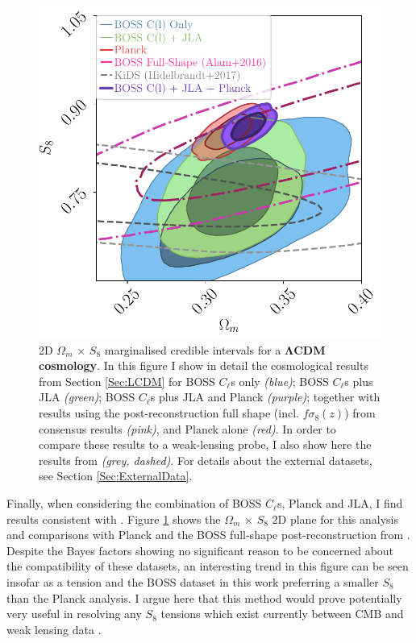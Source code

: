 \begin{figure}
\begin{center}
\includegraphics[scale=0.70]{BOSS-FIGS/LCDM_External_KidsOmega_m.pdf}
\caption[2D $\Omega_m \, \times \, S_8$ marginalised credible intervals for a $\Lambda$CDM cosmology.]{2D $\Omega_m \, \times \, S_8$ marginalised credible intervals for a \textbf{$\mathbf{\Lambda}$CDM cosmology}. In this figure I show in detail the cosmological results from Section \ref{Sec:LCDM} for BOSS $C_{\ell}$s only \textit{(blue)}; BOSS $C_{\ell}$s plus JLA \textit{(green)}; BOSS $C_{\ell}$s plus JLA and Planck \textit{(purple)}; together with results using the post-reconstruction full shape (incl. $f\sigma_8(z)$) from \protect\cite{2016BOSSCosmology} consensus results \textit{(pink)}, and Planck alone \textit{(red)}. In order to compare these results to a weak-lensing probe, I also show here the results from \protect\cite{2017MNRAS.465.1454H} \textit{(grey, dashed)}. For details about the external datasets, see Section \ref{Sec:ExternalData}.}
\label{fig:Om_S8_LCDM}
\end{center}
\end{figure}

\qquad Finally, when considering the combination of BOSS $C_{\ell}$s, Planck and JLA, I find results consistent with \cite{2016BOSSCosmology,2017MNRAS.465.1454H,2017arXiv170801530D}. Figure \ref{fig:Om_S8_LCDM} shows the $\Omega_m \, \times \, S_8 $ 2D plane for this analysis and comparisons with Planck and the BOSS full-shape post-reconstruction from \cite{2016BOSSCosmology}. Despite the Bayes factors showing no significant reason to be concerned about the compatibility of these datasets, an interesting trend in this figure can be seen insofar as a tension and the BOSS dataset in this work preferring a smaller $S_8$ than the Planck analysis. I argue here that this method would prove potentially very useful in resolving any $S_8$ tensions which exist currently between CMB and weak lensing data \citep{2015MacCrann,2017CharnockTension}.

